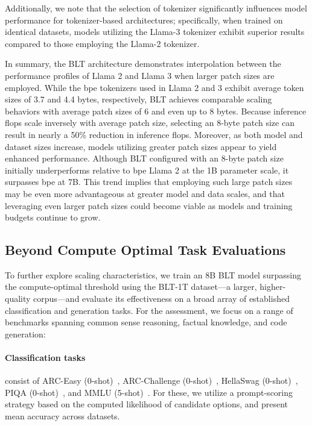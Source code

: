 Additionally, we note that the selection of tokenizer significantly influences model performance for tokenizer-based architectures; specifically, when trained on identical datasets, models utilizing the Llama-3 tokenizer exhibit superior results compared to those employing the Llama-2 tokenizer.

In summary, the {\textsc BLT} architecture demonstrates interpolation between the performance profiles of Llama 2 and Llama 3 when larger patch sizes are employed. While the bpe tokenizers used in Llama 2 and 3 exhibit average token sizes of 3.7 and 4.4 bytes, respectively, {\textsc BLT} achieves comparable scaling behaviors with average patch sizes of 6 and even up to 8 bytes. Because inference flops scale inversely with average patch size, selecting an 8-byte patch size can result in nearly a 50\% reduction in inference flops. Moreover, as both model and dataset sizes increase, models utilizing greater patch sizes appear to yield enhanced performance. Although {\textsc BLT} configured with an 8-byte patch size initially underperforms relative to bpe Llama 2 at the 1B parameter scale, it surpasses bpe at 7B. This trend implies that employing such large patch sizes may be even more advantageous at greater model and data scales, and that leveraging even larger patch sizes could become viable as models and training budgets continue to grow.

\subsection{Beyond Compute Optimal Task Evaluations}
\label{section:evals}
To further explore scaling characteristics, we train an 8B {\textsc BLT} model surpassing the compute-optimal threshold using the {\textsc BLT}-1T dataset—a larger, higher-quality corpus—and evaluate its effectiveness on a broad array of established classification and generation tasks. For the assessment, we focus on a range of benchmarks spanning common sense reasoning, factual knowledge, and code generation:
\paragraph{Classification tasks} consist of ARC-Easy (0-shot)~\citep{Eval_ARC}, ARC-Challenge (0-shot)~\citep{Eval_ARC}, HellaSwag (0-shot)~\citep{Eval_hellaswag}, PIQA (0-shot)~\citep{Eval_piqa}, and MMLU (5-shot)~\citep{hendrycks2020measuring}. For these, we utilize a prompt-scoring strategy based on the computed likelihood of candidate options, and present mean accuracy across datasets.

